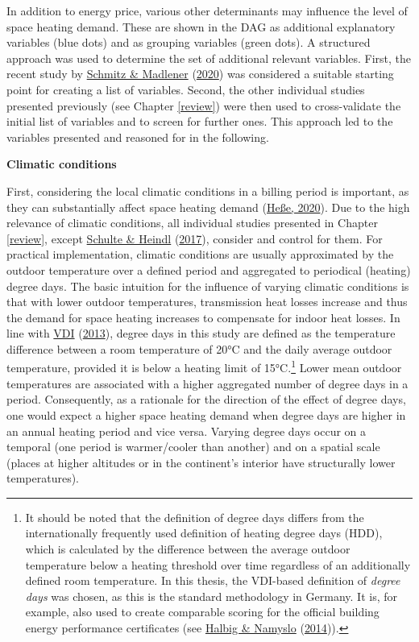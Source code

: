 \documentclass[12pt,twoside]{reedthesis}
\begin{document}
In addition to energy price, various other determinants may influence the level of space heating demand. These are shown in the DAG as additional explanatory variables (blue dots) and as grouping variables (green dots). A structured approach was used to determine the set of additional relevant variables. First, the recent study by \protect\hyperlink{ref-schmitz_madlener20}{Schmitz \& Madlener} (\protect\hyperlink{ref-schmitz_madlener20}{2020}) was considered a suitable starting point for creating a list of variables. Second, the other individual studies presented previously (see Chapter \ref{review}) were then used to cross-validate the initial list of variables and to screen for further ones. This approach led to the variables presented and reasoned for in the following.

\textbf{Climatic conditions}

First, considering the local climatic conditions in a billing period is important, as they can substantially affect space heating demand (\protect\hyperlink{ref-hesse20}{Heße, 2020}). Due to the high relevance of climatic conditions, all individual studies presented in Chapter \ref{review}, except \protect\hyperlink{ref-schulte_heindl17}{Schulte \& Heindl} (\protect\hyperlink{ref-schulte_heindl17}{2017}), consider and control for them. For practical implementation, climatic conditions are usually approximated by the outdoor temperature over a defined period and aggregated to periodical (heating) degree days. The basic intuition for the influence of varying climatic conditions is that with lower outdoor temperatures, transmission heat losses increase and thus the demand for space heating increases to compensate for indoor heat losses. In line with \protect\hyperlink{ref-vdi13}{VDI} (\protect\hyperlink{ref-vdi13}{2013}), degree days in this study are defined as the temperature difference between a room temperature of 20°C and the daily average outdoor temperature, provided it is below a heating limit of 15°C.\footnote{It should be noted that the definition of degree days differs from the internationally frequently used definition of heating degree days (HDD), which is calculated by the difference between the average outdoor temperature below a heating threshold over time regardless of an additionally defined room temperature. In this thesis, the VDI-based definition of \emph{degree days} was chosen, as this is the standard methodology in Germany. It is, for example, also used to create comparable scoring for the official building energy performance certificates (see \protect\hyperlink{ref-halbig_namyslo14}{Halbig \& Namyslo} (\protect\hyperlink{ref-halbig_namyslo14}{2014})).} Lower mean outdoor temperatures are associated with a higher aggregated number of degree days in a period. Consequently, as a rationale for the direction of the effect of degree days, one would expect a higher space heating demand when degree days are higher in an annual heating period and vice versa. Varying degree days occur on a temporal (one period is warmer/cooler than another) and on a spatial scale (places at higher altitudes or in the continent's interior have structurally lower temperatures).
\end{document}
